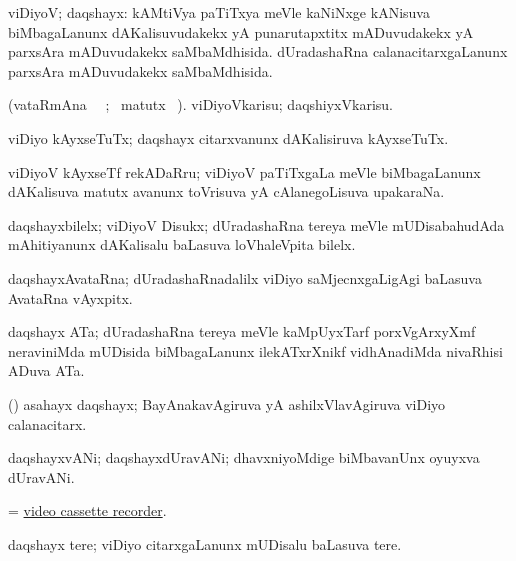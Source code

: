 \bentry
{} 
\gl{\gu}
\expl{}
\bmng
viDiyoV; daqshayx: 
\banum
{} kAMtiVya paTiTxya meVle kaNiNxge kANisuva biMbagaLanunx dAKalisuvudakekx yA punarutapxtitx mADuvudakekx yA parxsAra mADuvudakekx saMbaMdhisida. 
 dUradashaRna calanacitarxgaLanunx parxsAra mADuvudakekx saMbaMdhisida. 
\eanum
\emng
\eentry

\bentry
{} 
\gl{\sakirx}(vataRmAna \parxpu\ \Eva\ ; \BU\ matutx
\BUkaq\ ). \bmng
 viDiyoVkarisu; daqshiyxVkarisu. 
\emng
\eentry

\bentry
{}
\gl{\nA}
\expl{}
\bmng
 viDiyo kAyxseTuTx; daqshayx citarxvanunx dAKalisiruva kAyxseTuTx. 
\emng
\eentry

\bentry
{}
\gl{\nA}
\expl{}
\bmng
 viDiyoV kAyxseTf rekADaRru; viDiyoV paTiTxgaLa meVle biMbagaLanunx dAKalisuva matutx avanunx toVrisuva yA cAlanegoLisuva upakaraNa. 
\emng
\eentry

\bentry
{} 
\gl{\nA}
\expl{}
\bmng
 daqshayxbilelx; viDiyoV Disukx; dUradashaRna tereya meVle mUDisabahudAda mAhitiyanunx dAKalisalu baLasuva loVhaleVpita bilelx. 
\emng
\eentry

\bentry
{}
\gl{\nA}
\expl{}
\bmng
 daqshayxAvataRna; dUradashaRnadalilx viDiyo saMjecnxgaLigAgi baLasuva AvataRna vAyxpitx. 
\emng
\eentry

\bentry
{}
\gl{\nA}
\expl{}
\bmng
 daqshayx ATa; dUradashaRna tereya meVle kaMpUyxTarf porxVgArxyXmf neraviniMda mUDisida biMbagaLanunx ilekATxrXnikf vidhAnadiMda nivaRhisi ADuva ATa. 
\emng
\eentry

\bentry
{} 
\gl{\nA}
\expl{}
\bmng
 (\AmA) asahayx daqshayx; BayAnakavAgiruva yA ashilxVlavAgiruva viDiyo calanacitarx. 
\emng
\eentry

\bentry
{} 
\gl{\nA}
\expl{}
\bmng
 daqshayxvANi; daqshayxdUravANi; dhavxniyoMdige biMbavanUnx oyuyxva dUravANi. 
\emng
\eentry

\bentry
{}
\gl{\nA}
\expl{}
\bmng
 = \hyperlink{video cassette recorder}{video cassette recorder}. 
\emng
\eentry

\bentry
{}
\gl{\nA}
\expl{}
\bmng
 daqshayx tere; viDiyo citarxgaLanunx mUDisalu baLasuva tere. 
\emng
\eentry

